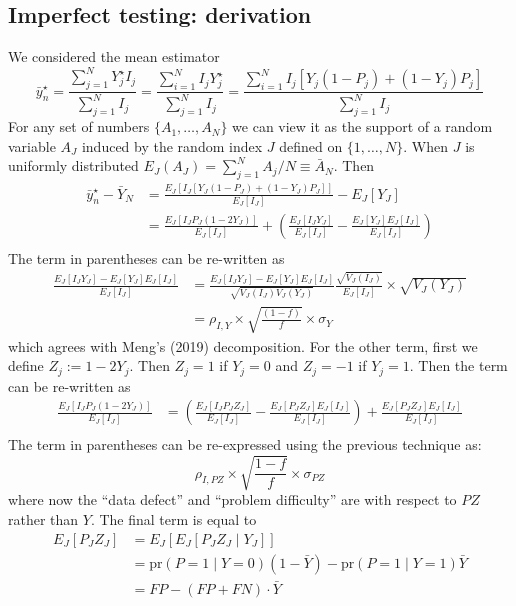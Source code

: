 \documentclass[12pt]{article}
\def\pr{\text{pr}}
\begin{document}
\subsection*{Imperfect testing: derivation}
\label{app:imperfect}
We considered the mean estimator
$$
\bar y_n^\star = \frac{\sum_{j=1}^N Y_j^\star I_j}{\sum_{j=1}^N I_j} = \frac{\sum_{i=1}^N  I_j Y_j^\star }{\sum_{j=1}^N  I_j } = \frac{\sum_{i=1}^N  I_j \left[ Y_j (1-P_j) + (1-Y_j) P_j \right]}{\sum_{j=1}^N  I_j }
$$
For any set of numbers $\{ A_1, \ldots, A_N \}$ we can view it as the support of a random variable $A_J$ induced by the random index $J$ defined on $\{1,\ldots, N\}$.  When $J$ is uniformly distributed $E_J (A_J) = \sum_{j=1}^N A_j / N \equiv \bar A_N$. Then
$$
\begin{aligned}
\bar y_n^\star  - \bar Y_N &= \frac{E_J \left[ I_J \left[ Y_J (1-P_J) + (1-Y_J) P_J \right] \right]}{E_J [ I_J ] } - E_J[Y_J] \\
&= \frac{E_J \left[ I_J P_J (1-2Y_J) \right]}{E_J [ I_J ] } + \left( \frac{E_J [I_J Y_J]}{E_J [ I_J ] } - \frac{E_J[Y_J] E_J[I_J]}{E_J[I_J]} \right) \\
\end{aligned}
$$
The term in parentheses can be re-written as
$$
\begin{aligned}
\frac{E_J [I_J Y_J]- E_J[Y_J] E_J[I_J]}{E_J[I_J]} &=  \frac{E_J [I_J Y_J]- E_J[Y_J] E_J[I_J]}{\sqrt{V_J(I_J) V_J(Y_J)}} \frac{\sqrt{V_J(I_J)}}{E_J[I_J]} \times \sqrt{V_J(Y_J)} \\
&= \rho_{I,Y} \times \sqrt{\frac{(1-f)}{f}} \times \sigma_Y
\end{aligned}
$$
which agrees with Meng's (2019) decomposition. For the other term, first we define $Z_j := 1 - 2 Y_j $. Then $Z_j = 1$ if $Y_j = 0$ and $Z_j = -1$ if $Y_j = 1$. Then the term can be re-written as
$$
\begin{aligned}
\frac{E_J \left[ I_J P_J (1-2Y_J) \right]}{E_J [ I_J ] } &= \left( \frac{E_J \left[ I_J P_J Z_J \right]}{E_J [ I_J ] } -  \frac{E_J \left[ P_J Z_J \right] E_J[ I_J]}{E_J [ I_J ] } \right) +  \frac{E_J \left[ P_J Z_J \right] E_J[ I_J]}{E_J [ I_J ] } \\
\end{aligned}
$$
The term in parentheses can be re-expressed using the previous technique as:
$$
\rho_{I, PZ} \times \sqrt{\frac{1-f}{f}} \times \sigma_{PZ}
$$
where now the ``data defect'' and ``problem difficulty'' are with respect to $PZ$ rather than $Y$. The final term is equal to
$$
\begin{aligned}
E_J [P_J Z_J ] &= E_J [ E_J [ P_J Z_J \mid Y_J ] ] \\
&= \pr (P = 1 \mid Y = 0) (1-\bar Y) - \pr(P=1 \mid Y = 1) \bar Y \\
&= FP - (FP + FN) \cdot \bar Y
\end{aligned}
$$
\end{document}
